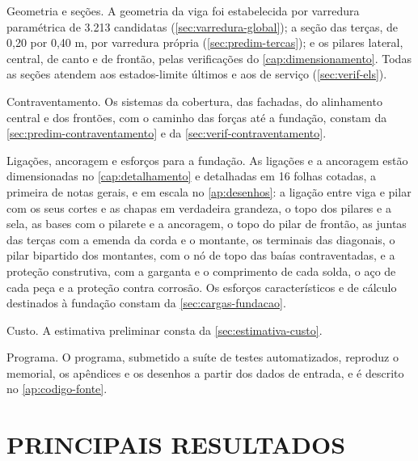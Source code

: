 \begin{alineas}
    \item Geometria e seções. A geometria da viga foi estabelecida por varredura
    paramétrica de 3.213 candidatas (\autoref{sec:varredura-global}); a seção das
    terças, de 0,20 por 0,40 m, por varredura própria
    (\autoref{sec:predim-tercas}); e os pilares lateral, central, de canto e de
    frontão, pelas verificações do \autoref{cap:dimensionamento}. Todas as seções
    atendem aos estados-limite últimos e aos de serviço
    (\autoref{sec:verif-els}).

    \item Contraventamento. Os sistemas da cobertura, das fachadas, do
    alinhamento central e dos frontões, com o caminho das forças até a fundação,
    constam da \autoref{sec:predim-contraventamento} e da
    \autoref{sec:verif-contraventamento}.

    \item Ligações, ancoragem e esforços para a fundação. As ligações e a
    ancoragem estão dimensionadas no \autoref{cap:detalhamento} e detalhadas em
    16 folhas cotadas, a primeira de notas gerais, e em escala no \autoref{ap:desenhos}: a ligação
    entre viga e pilar com os seus cortes e as chapas em verdadeira grandeza, o
    topo dos pilares e a sela, as bases com o pilarete e a ancoragem, o topo do
    pilar de frontão, as juntas das terças com a emenda da corda e o montante, os
    terminais das diagonais, o pilar bipartido dos montantes, com o nó de topo
    das baías contraventadas, e a proteção construtiva, com a garganta e o
    comprimento de cada solda, o aço de cada peça e a proteção contra corrosão.
    Os esforços
    característicos e de cálculo destinados à fundação constam da
    \autoref{sec:cargas-fundacao}.

    \item Custo. A estimativa preliminar consta da
    \autoref{sec:estimativa-custo}.

    \item Programa. O programa, submetido a suíte de \nTestes{} testes automatizados,
    reproduz o memorial, os apêndices e os desenhos a partir dos dados de
    entrada, e é descrito no \autoref{ap:codigo-fonte}.
\end{alineas}

\section{PRINCIPAIS RESULTADOS}\label{sec:principais-resultados}

